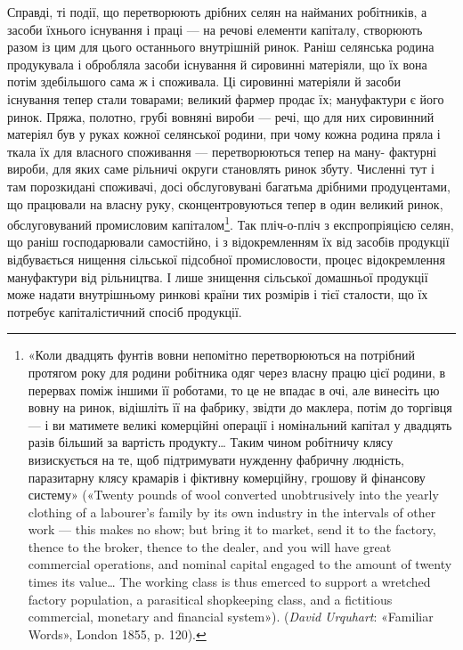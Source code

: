 Справді, ті події, що перетворюють дрібних селян на найманих
робітників, а засоби їхнього існування і праці — на речові
елементи капіталу, створюють разом із цим для цього останнього
внутрішній ринок. Раніш селянська родина продукувала
і обробляла засоби існування й сировинні матеріяли, що їх вона
потім здебільшого сама ж і споживала. Ці сировинні матеріяли
й засоби існування тепер стали товарами; великий фармер продає
їх; мануфактури є його ринок. Пряжа, полотно, грубі вовняні
вироби — речі, що для них сировинний матеріял був у руках
кожної селянської родини, при чому кожна родина пряла і ткала
їх для власного споживання — перетворюються тепер на ману-
фактурні вироби, для яких саме рільничі округи становлять
ринок збуту. Численні тут і там порозкидані споживачі, досі
обслуговувані багатьма дрібними продуцентами, що працювали
на власну руку, сконцентровуються тепер в один великий ринок,
обслуговуваний промисловим капіталом\footnote{
«Коли двадцять фунтів вовни непомітно перетворюються на потрібний
протягом року для родини робітника одяг через власну працю
цієї родини, в перервах поміж іншими її роботами, то це не впадає в очі,
але винесіть цю вовну на ринок, відішліть її на фабрику, звідти до маклера,
потім до торгівця — і ви матимете великі комерційні операції і
номінальний капітал у двадцять разів більший за вартість продукту\dots{}
Таким чином робітничу клясу визискується на те, щоб підтримувати
нужденну фабричну людність, паразитарну клясу крамарів і фіктивну
комерційну, грошову й фінансову систему» («Twenty pounds of wool
converted unobtrusively into the yearly clothing of a labourer’s family
by its own industry in the intervals of other work — this makes no show;
but bring it to market, send it to the factory, thence to the broker, thence
to the dealer, and you will have great commercial operations, and nominal
capital engaged to the amount of twenty times its value\dots{} The working
class is thus emerced to support a wretched factory population, a parasitical
shopkeeping class, and a fictitious commercial, monetary and financial
system»). (\emph{David Urquhart}: «Familiar Words», London 1855, p. 120).
}. Так пліч-о-пліч
з експропріяцією селян, що раніш господарювали самостійно, і
з відокремленням їх від засобів продукції відбувається нищення
сільської підсобної промисловости, процес відокремлення мануфактури
від рільництва. І лише знищення сільської домашньої
продукції може надати внутрішньому ринкові країни тих розмірів
і тієї сталости, що їх потребує капіталістичний спосіб продукції.

